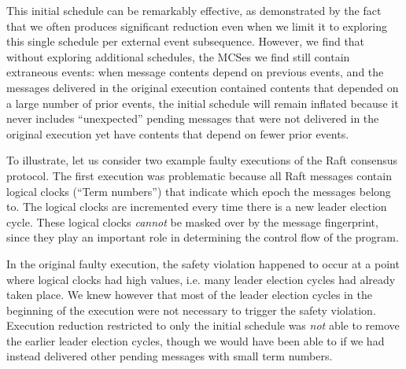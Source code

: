  This initial schedule
can be remarkably effective, as demonstrated by the fact that we often
produces significant reduction
even when we limit it to exploring this single schedule per external event subsequence. However, we find
that without exploring additional schedules, the MCSes we find still
contain extraneous events: when message contents depend on previous
events, and the messages delivered in the original execution contained
contents that depended on a large number of prior events, the initial schedule
will remain inflated because it never includes ``unexpected'' pending messages
that were not delivered in the original execution yet have contents that depend on fewer prior
events.

To illustrate, let us consider two example faulty executions of the Raft
consensus protocol. The first execution was problematic because all Raft messages contain logical clocks (``Term numbers'') that
indicate which epoch the messages belong to. The logical clocks are
incremented every time there is a new leader election cycle. These logical
clocks {\em cannot} be masked over by the message fingerprint, since they play
an important role in determining the control flow of the program.



In the original faulty execution, the
safety violation happened to occur at a point where
logical clocks had high values, i.e. many leader election cycles had already taken
place. We knew however that
most of the leader election cycles in the beginning of the execution were not
necessary to trigger the safety violation. Execution reduction restricted to only
the initial schedule was {\em not} able to remove the earlier
leader election cycles, though we would have been able to if we had instead delivered
other pending messages with small term numbers.

